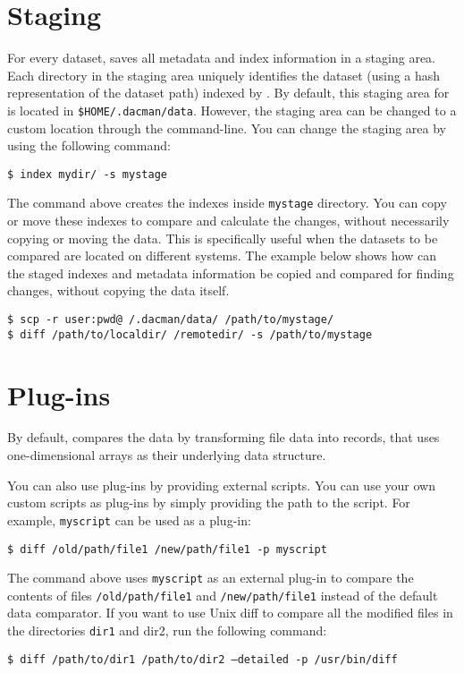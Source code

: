 \section{Staging}
For every dataset, \systemname saves all metadata and index
information in a staging area. Each directory in
the staging area uniquely identifies the dataset (using a hash
representation of the dataset path) indexed by \systemname.
By default, this staging area for is located in
\texttt{\$HOME/.dacman/data}. However, the staging
area can be changed to a custom location through the
command-line. You can change the staging area by using
the following command:

\texttt{\$ \appcmd index mydir/ -s mystage}

The command above creates the indexes inside \texttt{mystage}
directory. You can copy or move these indexes to compare
and calculate the changes, without necessarily copying or
moving the data. This is specifically useful when the datasets
to be compared are located on different systems. The example
below shows how can the staged indexes and metadata information
be copied and compared for finding changes, without copying
the data itself.

\texttt{\$ scp -r user:pwd@~/.dacman/data/ /path/to/mystage/}\\
\texttt{\$ \appcmd diff /path/to/localdir/ /remotedir/ -s /path/to/mystage}

\section{Plug-ins}
By default, \systemname compares the data by transforming file data
into \systemname records, that uses one-dimensional arrays as their
underlying data structure.

You can also use plug-ins by providing external scripts. You can use
your own custom scripts as plug-ins by simply providing the path to
the script. For example, \texttt{myscript} can be used as a plug-in:

\texttt{\$ \appcmd diff /old/path/file1 /new/path/file1 -p myscript}

The command above uses \texttt{myscript} as an external plug-in to compare
the contents of files \texttt{/old/path/file1} and \texttt{/new/path/file1}
instead of the default \systemname data comparator. If you want to
use Unix diff to compare all the modified files in the directories
\texttt{dir1} and {dir2}, run the following command:

\texttt{\$ \appcmd diff /path/to/dir1 /path/to/dir2 --detailed -p /usr/bin/diff}

